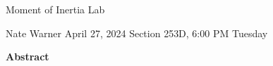 \documentclass{report}
\title{\Huge{}}
\author{\huge{Nathan Warner}}
\date{\huge{}}
\begin{document}
    \begin{center}
        \begin{Huge}
            Moment of Inertia Lab
        \end{Huge}
        \begin{Large}
            \bigbreak \noindent 
            Nate Warner
            \smallbreak \noindent
            April 27, 2024
            \bigbreak \noindent 
            Section 253D, 6:00 PM Tuesday 
        \end{Large}
    \end{center}
    \pagebreak 
    \tableofcontents
    \pagebreak \bigbreak \noindent 
    \begin{center}
    \textbf{Abstract}
    \end{center}
    \begin{adjustwidth}{.3in}{.3in}
        \hspace{\parindent} 
    \end{adjustwidth}

    \bigbreak \noindent 
\end{document}
